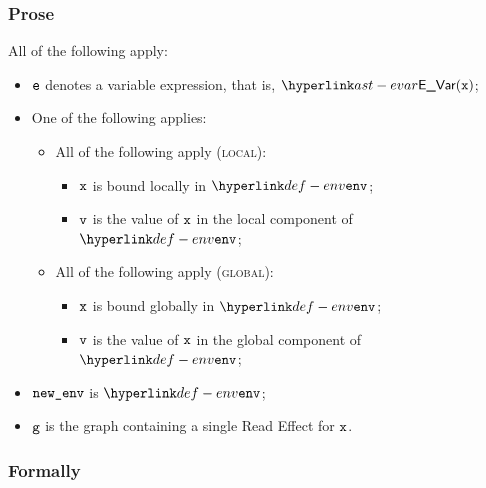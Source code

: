 \subsubsection{Prose}
All of the following apply:
\begin{itemize}
  \item $\ve$ denotes a variable expression, that is, $\EVar(\vx)$;
  \item One of the following applies:
  \begin{itemize}
    \item All of the following apply (\textsc{local}):
    \begin{itemize}
      \item $\vx$ is bound locally in $\env$;
      \item $\vv$ is the value of $\vx$ in the local component of $\env$;
    \end{itemize}

    \item All of the following apply (\textsc{global}):
    \begin{itemize}
      \item $\vx$ is bound globally in $\env$;
      \item $\vv$ is the value of $\vx$ in the global component of $\env$;
    \end{itemize}
  \end{itemize}
  \item $\newenv$ is $\env$;
  \item $\vg$ is the graph containing a single Read Effect for $\vx$.
\end{itemize}

\subsubsection{Formally}
\begin{mathpar}
\end{mathpar}

\begin{mathpar}
\end{mathpar}

